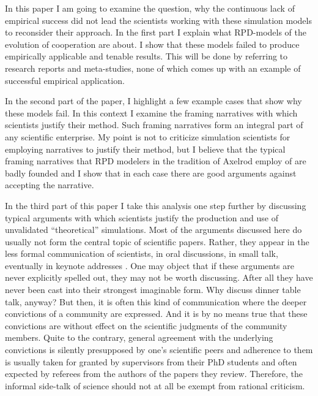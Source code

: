 \documentclass[graybox, English]{svmult}
\begin{document}
In this paper I am going to examine the question, why the continuous
lack of empirical success did not lead the scientists working with
these simulation models to reconsider their approach. In the first
part I explain what RPD-models of the evolution of cooperation are
about. I show that these models failed to produce empirically
applicable and tenable results. This will be done by referring to
research reports and meta-studies, none of which comes up with an
example of successful empirical application. 

In the second part of the paper, I highlight a few example cases that
show why these models fail. In this context I examine the framing
narratives with which scientists justify their method. Such framing
narratives form an integral part of any scientific
enterprise. My point is not to criticize simulation scientists for
employing narratives to justify their method, but I believe that the
typical framing narratives that RPD modelers in the tradition of
Axelrod employ of are badly founded and I show that in each case there are 
good arguments against accepting the narrative.

In the third part of this paper I take this analysis one step further
by discussing typical arguments with which scientists justify the
production and use of unvalidated ``theoretical'' simulations. Most of
the arguments discussed here do usually not form the central topic of
scientific papers. Rather, they appear in the less formal
communication of scientists, in oral discussions, in small talk,
eventually in keynote addresses \citep{epstein:2008}. One may object
that if these arguments are never explicitly spelled out, they may not
be worth discussing. After all they have never been cast into their
strongest imaginable form. Why discuss dinner table talk, anyway? But
then, it is often this kind of communication where the deeper
convictions of a community are expressed. And it is by no means true
that these convictions are without effect on the scientific judgments
of the community members. Quite to the contrary, general agreement
with the underlying convictions is silently presupposed by one's
scientific peers and adherence to them is usually taken for granted by
supervisors from their PhD students and often expected by referees
from the authors of the papers they review. Therefore, the informal
side-talk of science should not at all be exempt from rational
criticism.
\end{document}
